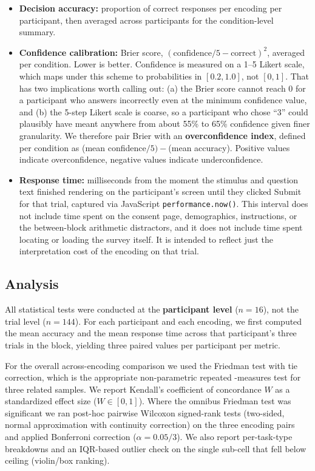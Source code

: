\documentclass{article}
\begin{document}
\begin{itemize}[leftmargin=*, itemsep=4pt]
\item \textbf{Decision accuracy:} proportion of correct responses per
  encoding per participant, then averaged across participants for the
  condition-level summary.
\item \textbf{Confidence calibration:} Brier score,
  $(\text{confidence}/5 - \text{correct})^2$, averaged per condition.
  Lower is better.  Confidence is measured on a 1--5 Likert scale,
  which maps under this scheme to probabilities in $[0.2, 1.0]$, not
  $[0, 1]$.  That has two implications worth calling out: (a) the
  Brier score cannot reach 0 for a participant who answers
  incorrectly even at the minimum confidence value, and (b) the 5-step
  Likert scale is coarse, so a participant who chose ``3'' could
  plausibly have meant anywhere from about 55\% to 65\% confidence
  given finer granularity.  We therefore pair Brier with an
  \textbf{overconfidence index}, defined per condition as
  (mean confidence$/5) - $(mean accuracy).  Positive values indicate
  overconfidence, negative values indicate underconfidence.
\item \textbf{Response time:} milliseconds from the moment the
  stimulus and question text finished rendering on the participant's
  screen until they clicked Submit for that trial, captured via
  JavaScript \texttt{performance.now()}.  This interval does not
  include time spent on the consent page, demographics, instructions,
  or the between-block arithmetic distractors, and it does not include
  time spent locating or loading the survey itself.  It is intended
  to reflect just the interpretation cost of the encoding on that
  trial.
\end{itemize}

\subsection{Analysis}

All statistical tests were conducted at the \textbf{participant
level} ($n = 16$), not the trial level ($n = 144$).  For each
participant and each encoding, we first computed the mean accuracy and
the mean response time across that participant's three trials in the
block, yielding three paired values per participant per metric.

For the overall across-encoding comparison we used the Friedman test
with tie correction, which is the appropriate non-parametric repeated
-measures test for three related samples.  We report Kendall's
coefficient of concordance $W$ as a standardized effect size
($W \in [0, 1]$).  Where the omnibus Friedman test was significant we
ran post-hoc pairwise Wilcoxon signed-rank tests (two-sided, normal
approximation with continuity correction) on the three encoding
pairs and applied Bonferroni correction ($\alpha = 0.05 / 3$).  We
also report per-task-type breakdowns and an IQR-based outlier check
on the single sub-cell that fell below ceiling (violin/box ranking).
\end{document}
